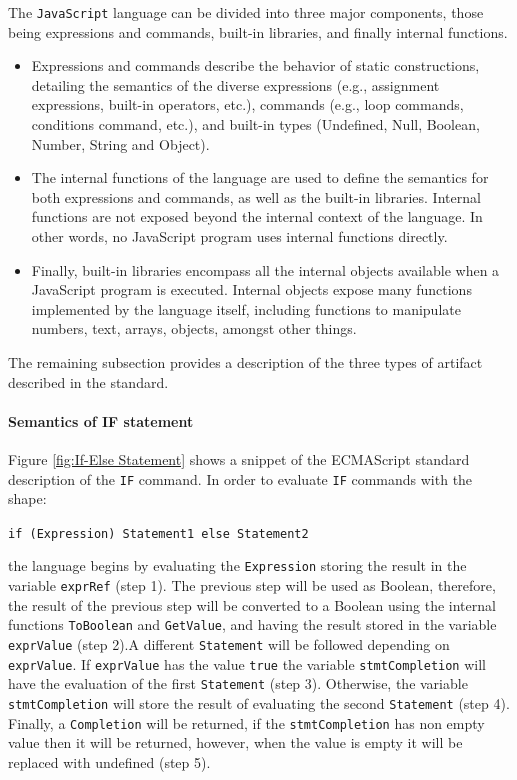 \documentclass[runningheads]{llncs}
\begin{document}
The \texttt{JavaScript} language can be divided into three major components, those being expressions and commands, built-in libraries, and finally internal functions.
%
\begin{itemize}
\item Expressions and commands describe the behavior of static constructions, detailing the semantics of the diverse expressions (e.g., assignment expressions, built-in operators, etc.), commands (e.g., loop commands, conditions command, etc.), and built-in types (Undefined, Null, Boolean, Number, String and Object).
%
\item The internal functions of the language are used to define the semantics for both expressions and commands, as well as the built-in libraries. Internal functions are not exposed beyond the internal context of the language. In other words, no JavaScript program uses internal functions directly.
%
\item Finally, built-in libraries encompass all the internal objects available when a JavaScript program is executed. Internal objects expose many functions implemented by the language itself, including functions to manipulate numbers, text, arrays, objects, amongst other things.
\end{itemize}


The remaining subsection provides a description of the three types of artifact described in the standard.

\paragraph{Semantics of IF statement}
Figure \ref{fig:If-Else Statement} shows a snippet of the ECMAScript standard description of the \texttt{IF} command. In order to evaluate \texttt{IF} commands with the shape:

\begin{center}
\texttt{if (Expression) Statement1 else Statement2}
\end{center}

\noindent the language begins by evaluating the \texttt{Expression} storing the result in the variable \texttt{exprRef} (step 1). The previous step will be used as Boolean, therefore, the result of the previous step will be converted to a Boolean using the internal functions \texttt{ToBoolean} and \texttt{GetValue}, and having the result stored in the variable \texttt{exprValue} (step 2).A different \texttt{Statement} will be followed depending on \texttt{exprValue}. If \texttt{exprValue} has the value \texttt{true} the variable \texttt{stmtCompletion} will have the evaluation of the first \texttt{Statement} (step 3). Otherwise, the variable \texttt{stmtCompletion} will store the result of evaluating the second \texttt{Statement} (step 4). Finally, a \texttt{Completion} will be returned, if the \texttt{stmtCompletion} has non empty value then it will be returned, however, when the value is empty it will be replaced with undefined (step 5).
\end{document}
